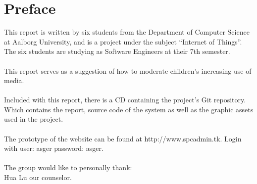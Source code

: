 \chapter*{Preface}
\label{chap:preface}
This report is written by six students from the Department of Computer Science at Aalborg University, and is a project under the subject ``Internet of Things''. The six students are studying as Software Engineers at their 7th semester.\\
\\
This report serves as a suggestion of how to moderate children's increasing use of media.\\
\\
Included with this report, there is a CD containing the project's Git repository. Which contains the report, source code of the system as well as the graphic assets used in the project.\\
\\
The prototype of the website can be found at http://www.spcadmin.tk. Login with user: asger password: asger.\\
\\
The group would like to personally thank:\\
Hua Lu our counselor.
